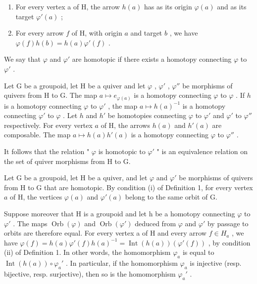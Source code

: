 \begin{enumerate}
\def\labelenumi{(\roman{enumi})}
\item
  For every vertex a of H, the arrow \(h(a)\) has as its origin \(\varphi(a)\) and as its target \(\varphi'(a)\) ;
\item
  For every arrow \(f\) of H, with origin \(a\) and target \(b\) , we have \(\varphi(f)h(b)=h(a)\varphi'(f)\) .
\end{enumerate}

We say that \(\varphi\) and \(\varphi'\) are homotopic if there exists a homotopy connecting \(\varphi\) to \(\varphi'\) .

Let G be a groupoid, let H be a quiver and let \(\varphi\) , \(\varphi'\) , \(\varphi''\) be morphisms of quivers from H to G. The map \(a \mapsto e_{\varphi(a)}\) is a homotopy connecting \(\varphi\) to \(\varphi\) . If \(h\) is a homotopy connecting \(\varphi\) to \(\varphi'\) , the map \(a \mapsto h(a)^{-1}\) is a homotopy connecting \(\varphi'\) to \(\varphi\) . Let \(h\) and \(h'\) be homotopies connecting \(\varphi\) to \(\varphi'\) and \(\varphi'\) to \(\varphi''\) respectively. For every vertex \(a\) of H, the arrows \(h(a)\) and \(h'(a)\) are composable. The map \(a \mapsto h(a)h'(a)\) is a homotopy connecting \(\varphi\) to \(\varphi''\) .

It follows that the relation " \(\varphi\) is homotopic to \(\varphi'\) " is an equivalence relation on the set of quiver morphisms from H to G.

Let G be a groupoid, let H be a quiver, and let \(\varphi\) and \(\varphi'\) be morphisms of quivers from H to G that are homotopic. By condition (i) of Definition 1, for every vertex \(a\) of H, the vertices \(\varphi(a)\) and \(\varphi'(a)\) belong to the same orbit of G.

Suppose moreover that H is a groupoid and let h be a homotopy connecting \(\varphi\) to \(\varphi'\) . The maps \(\operatorname{Orb}(\varphi)\) and \(\operatorname{Orb}(\varphi')\) deduced from \(\varphi\) and \(\varphi'\) by passage to orbits are therefore equal. For every vertex a of H and every arrow \(f \in H_{a}\) , we have \(\varphi(f) = h(a)\varphi'(f)h(a)^{-1} = \operatorname{Int}(h(a))(\varphi'(f))\) , by condition (ii) of Definition 1. In other words, the homomorphism \(\varphi_{a}\) is equal to \(\operatorname{Int}(h(a)) \circ \varphi_{a}'\) . In particular, if the homomorphism \(\varphi_{a}\) is injective (resp. bijective, resp. surjective), then so is the homomorphism \(\varphi_{a}'\) .

